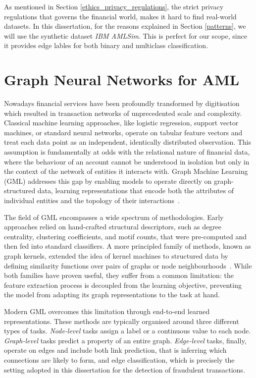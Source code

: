 As mentioned in Section \ref{ethics_privacy_regulations}, the strict privacy regulations that governs the financial world, makes it hard to find real-world datasets. In this dissertation, for the reasons explained in Section \ref{patterns}, we will use the synthetic dataset \textit{IBM AMLSim}. This is perfect for our scope, since it provides edge lables for both binary and multiclass classification.

\section{Graph Neural Networks for AML}\label{sec:GNNintro}
Nowadays financial services have been profoundly transformed by digitisation which resulted in transaction networks of unprecedented scale and complexity. 
Classical machine learning approaches, like logistic regression, support vector machines, or standard neural networks, operate on tabular feature vectors and treat each data point as an independent, identically distributed observation. This assumption is fundamentally at odds with the relational nature of financial data, where the behaviour of an account cannot be understood in isolation but only in the context of the network of entities it interacts with. Graph Machine Learning (GML) addresses this gap by enabling models to operate directly on graph-structured data, learning representations that encode both the attributes of individual entities and the topology of their interactions~\cite{hamilton2020graph}.

The field of GML encompasses a wide spectrum of methodologies. Early approaches relied on hand-crafted structural descriptors, such as degree centrality, clustering coefficients, and motif counts, that were pre-computed and then fed into standard classifiers. A more principled family of methods, known as graph kernels, extended the idea of kernel machines to structured data by defining similarity functions over pairs of graphs or node neighbourhoods~\cite{kriege2020survey}. While both families have proven useful, they suffer from a common limitation: the feature extraction process is decoupled from the learning objective, preventing the model from adapting its graph representations to the task at hand.

Modern GML overcomes this limitation through end-to-end learned representations. These methods are typically organised around three different types of tasks. \textit{Node-level} tasks assign a label or a continuous value to each node. \textit{Graph-level} tasks predict a property of an entire graph. \textit{Edge-level} tasks, finally, operate on edges and include both link prediction, that is inferring which connections are likely to form, and edge classification, which is precisely the setting adopted in this dissertation for the detection of fraudulent transactions.


